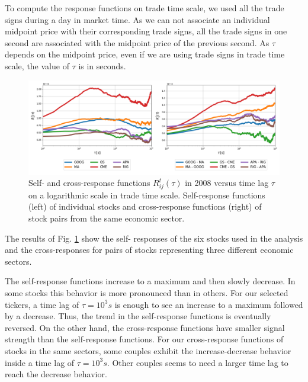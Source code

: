 To compute the response functions on trade time scale, we used all the trade
signs during a day in market time. As we can not associate an individual
midpoint price with their corresponding trade signs, all the trade signs in one
second are associated with the midpoint price of the previous second.
As $\tau$ depends on the midpoint price, even if we are using trade signs in
trade time scale, the value of $\tau$ is in seconds.

\begin{figure}[htbp]
    \centering
    \includegraphics[width=\textwidth]
    {figures/03_responses_trade_scale_2008.png}
    \caption{Self- and cross-response functions
             $R^{t}_{ij}\left(\tau\right)$ in 2008 versus time lag $\tau$ on a
             logarithmic scale in trade time scale. Self-response functions
             (left) of individual stocks and cross-response functions (right)
             of stock pairs from the same economic sector.}
    \label{fig:response_function_trade_scale}
\end{figure}

The results of Fig. \ref{fig:response_function_trade_scale} show the self-
responses of the six stocks used in the analysis and the cross-responses for
pairs of stocks representing three different economic sectors.

The self-response functions increase to a maximum and then slowly decrease. In
some stocks this behavior is more pronounced than in others. For our selected
tickers, a time lag of $\tau = 10^{3}s$ is enough to see an increase to a
maximum followed by a decrease. Thus, the trend in the self-response functions
is eventually reversed.
On the other hand, the cross-response functions have smaller signal strength
than the self-response functions. For our cross-response functions of stocks in
the same sectors, some couples exhibit the increase-decrease behavior inside a
time lag of $\tau = 10^{3}s$. Other couples seems to need a larger time lag to
reach the decrease behavior.

